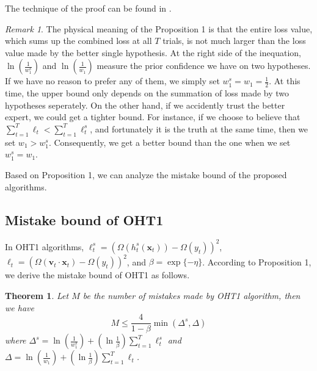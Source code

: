 \documentclass{article} %
\newtheorem{thm}{Theorem}
\theoremstyle{remark}
\newtheorem*{rem}{Remark}
\theoremstyle{definition}
\begin{document}
The technique of the proof can be found in \cite{1997decisionFreund}.
\begin{rem}
The physical meaning of the Proposition 1 is that the entire loss value, which sums up the combined loss at all $T$ trials, is not much larger than the loss value made by the better single hypothesis.
At the right side of the inequation, $\ln(\frac{1}{w_{1}^{s}})$ and $\ln(\frac{1}{w_1})$ measure the prior confidence we have on two hypotheses.
If we have no reason to prefer any of them, we simply set $w_{1}^{s} = w_1 = \frac{1}{2}$.
At this time, the upper bound only depends on the summation of loss made by two hypotheses seperately.
On the other hand, if we accidently trust the better expert, we could get a tighter bound.
For instance, if we choose to believe that $\sum\limits_{t=1}^{T} \ell_{t} < \sum\limits_{t=1}^{T} \ell_{t}^{s}$, and fortunately it is the truth at the same time, then we set $w_1 > w_{1}^{s}$.
Consequently, we get a better bound than the one when we set $w_{1}^{s} = w_{1}$.

Based on Proposition 1, we can analyze the mistake bound of the proposed algorithms.

\end{rem}

\subsection{Mistake bound of OHT1}

In OHT1 algorithms, $\ell_{t}^{s} = (\varOmega(h_{t}^{s}(\mathbf{x}_t)) - \varOmega(y_t)) ^ 2$, $\ell_t = (\varOmega(\mathbf{v}_t \cdot \mathbf{x}_t) - \varOmega(y_t)) ^ 2$, and $\beta = \exp\{-\eta\}$.
According to Proposition 1, we derive the mistake bound of OHT1 as follows.

\begin{thm}
Let $M$ be the number of mistakes made by OHT1 algorithm, then we have 
$$ M \leq \frac{4}{1-\beta} \min (\varDelta^s, \varDelta) $$
where
$ \varDelta^s = \ln(\frac{1}{w_{1}^{s}}) + (\ln \frac{1}{\beta}) \sum\limits_{t=1}^{T} \ell_{t}^{s} $ and $ \varDelta = \ln(\frac{1}{w_{1}}) + (\ln \frac{1}{\beta}) \sum\limits_{t=1}^{T} \ell_{t} $.
\end{thm}
\end{document}

